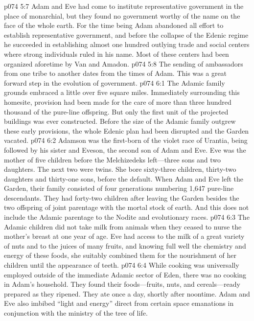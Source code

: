 \vs p074 5:7 Adam and Eve had come to institute representative government in the place of monarchial, but they found no government worthy of the name on the face of the whole earth. For the time being Adam abandoned all effort to establish representative government, and before the collapse of the Edenic regime he succeeded in establishing almost one hundred outlying trade and social centers where strong individuals ruled in his name. Most of these centers had been organized aforetime by Van and Amadon.\plusone
\vs p074 5:8 The sending of ambassadors from one tribe to another dates from the times of Adam. This was a great forward step in the evolution of government.
\vs p074 6:1 The Adamic family grounds embraced a little over five square miles. Immediately surrounding this homesite, provision had been made for the care of more than three hundred thousand of the pure\hyp{}line offspring. But only the first unit of the projected buildings was ever constructed. Before the size of the Adamic family outgrew these early provisions, the whole Edenic plan had been disrupted and the Garden vacated.
\pc \vs p074 6:2 Adamson was the first\hyp{}born of the violet race of Urantia, being followed by his sister and Eveson, the second son of Adam and Eve. Eve was the mother of five children before the Melchizedeks left---three sons and two daughters. The next two were twins. She bore sixty\hyp{}three children, thirty\hyp{}two daughters and thirty\hyp{}one sons, before the default. When Adam and Eve left the Garden, their family consisted of four generations numbering 1,647 pure\hyp{}line descendants. They had forty\hyp{}two children after leaving the Garden besides the two offspring of joint parentage with the mortal stock of earth. And this does not include the Adamic parentage to the Nodite and evolutionary races.
\vs p074 6:3 The Adamic children did not take milk from animals when they ceased to nurse the mother’s breast at one year of age. Eve had access to the milk of a great variety of nuts and to the juices of many fruits, and knowing full well the chemistry and energy of these foods, she suitably combined them for the nourishment of her children until the appearance of teeth.
\vs p074 6:4 While cooking was universally employed outside of the immediate Adamic sector of Eden, there was no cooking in Adam’s household. They found their foods---fruits, nuts, and cereals---ready prepared as they ripened. They ate once a day, shortly after noontime. Adam and Eve also imbibed “light and energy” direct from certain space emanations in conjunction with the ministry of the tree of life.
